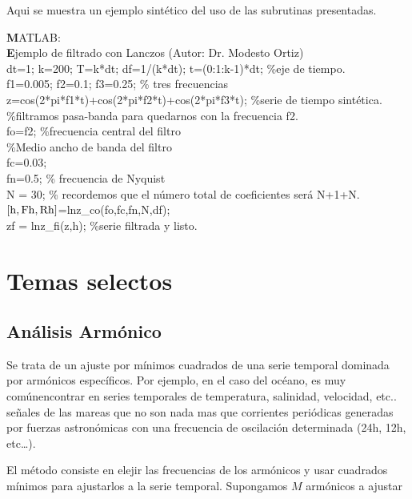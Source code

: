 \documentclass[
]{agujournal2019}
\begin{document}
Aqui se muestra un ejemplo sintético del uso de las subrutinas
presentadas.

\begin{framed}
{\noindent \textbf MATLAB:}\\
{\textbf Ejemplo de filtrado con Lanczos (Autor: Dr. Modesto Ortiz)}\\
{\noindent}dt=1; k=200; T=k*dt; df=1/(k*dt); t=(0:1:k-1)*dt; \%eje de tiempo.\\
f1=0.005; f2=0.1; f3=0.25; \% tres frecuencias\\
z=cos(2*pi*f1*t)+cos(2*pi*f2*t)+cos(2*pi*f3*t); \%serie de tiempo sintética.
\\
\%filtramos pasa-banda para quedarnos con la frecuencia f2. \\
fo=f2; \%frecuencia central del filtro\\
\%Medio ancho de banda del filtro \\
fc=0.03;\\
fn=0.5; \% frecuencia de Nyquist\\
N = 30; \% recordemos que el número total de coeficientes será N+1+N. \\
$[{\rm h},{\rm Fh},{\rm Rh}]$=lnz\_co(fo,fc,fn,N,df);\\
zf = lnz\_fi(z,h); \%serie filtrada y listo.
\end{framed}

\hypertarget{temas-selectos}{%
\section{Temas selectos}\label{temas-selectos}}

\hypertarget{anuxe1lisis-armuxf3nico}{%
\subsection{Análisis Armónico}\label{anuxe1lisis-armuxf3nico}}

Se trata de un ajuste por mínimos cuadrados de una serie temporal
dominada por armónicos específicos. Por ejemplo, en el caso del océano,
es muy comúnencontrar en series temporales de temperatura, salinidad,
velocidad, etc.. señales de las mareas que no son nada mas que
corrientes periódicas generadas por fuerzas astronómicas con una
frecuencia de oscilación determinada (24h, 12h, etc\ldots).

El método consiste en elejir las frecuencias de los armónicos y usar
cuadrados mínimos para ajustarlos a la serie temporal. Supongamos \(M\)
armónicos a ajustar
\end{document}
